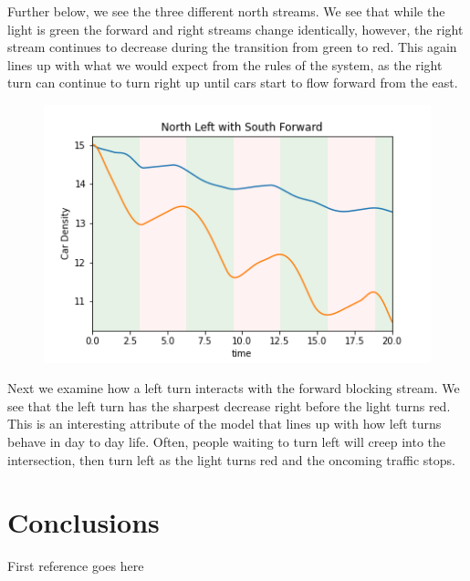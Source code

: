 \documentclass[12pt]{article}
\begin{document}
	Further below, we see the three different north streams. We see that while the light is green the forward and right streams change identically, however, the right stream continues to decrease during the transition from green to red. This again lines up with what we would expect from the rules of the system, as the right turn can continue to turn right up until cars start to flow forward from the east.\\
	
	\begin{figure}[h!]
		\centering
		\includegraphics[width=12cm]{figures/NorthLeftwithSouthForward.png}
		\label{fig:NorthLeftwithSouthForward}
	\end{figure}
	
	Next we examine how a left turn interacts with the forward blocking stream. We see that the left turn has the sharpest decrease right before the light turns red. This is an interesting attribute of the model that lines up with how left turns behave in day to day life. Often, people waiting to turn left will creep into the intersection, then turn left as the light turns red and the oncoming traffic stops.\\
	
	\section{Conclusions}
	
	\begin{thebibliography}{99}
		 First reference goes here
	\end{thebibliography}
	
\end{document}
